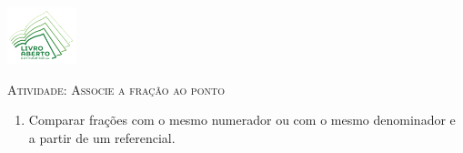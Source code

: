 \documentclass[10 pt,usenames,dvipsnames, oneside]{article}
\begin{document}
\begin{center}
  \begin{minipage}[l]{3cm}
\includegraphics[width=2cm]{../../../Figuras/logo}       
\end{minipage}\hfill
\begin{minipage}[r]{.8\textwidth}
 {\Large \scshape Atividade: Associe a fração ao ponto}  
\end{minipage}
\end{center}
\vspace{.2cm}

\ifdefined\prof
\begin{goals}
\begin{enumerate}
\item       Comparar frações com o mesmo numerador ou com o mesmo denominador e a partir de um referencial.
\end{enumerate}

\tcblower


\end{goals}
\end{document}
